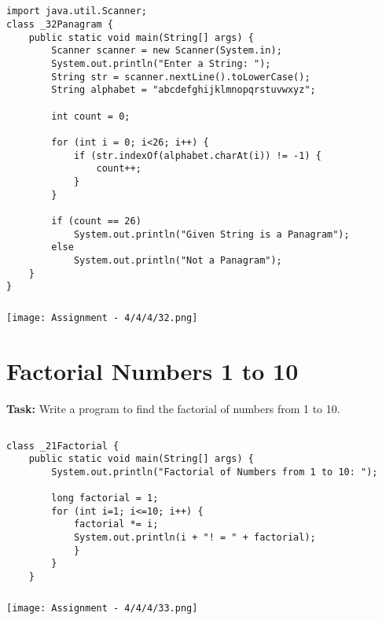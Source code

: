 \documentclass[12pt,a4paper]{article}
\begin{document}
\subsection{}
\begin{lstlisting}
import java.util.Scanner;
class _32Panagram {
    public static void main(String[] args) {
        Scanner scanner = new Scanner(System.in);
        System.out.println("Enter a String: ");
        String str = scanner.nextLine().toLowerCase();
        String alphabet = "abcdefghijklmnopqrstuvwxyz";
    
        int count = 0;
    
        for (int i = 0; i<26; i++) {
            if (str.indexOf(alphabet.charAt(i)) != -1) {
                count++;
            }
        }
    
        if (count == 26)
            System.out.println("Given String is a Panagram");
        else
            System.out.println("Not a Panagram");
    }
}
\end{lstlisting}

\subsubsection{}
\begin{center}
    \texttt{[image: Assignment - 4/4/4/32.png]}
\end{center}


\section{Factorial Numbers 1 to 10}
\textbf{Task:} Write a program to find the factorial of numbers from 1 to 10.

\subsection{}
\begin{lstlisting}
class _21Factorial {
    public static void main(String[] args) {
        System.out.println("Factorial of Numbers from 1 to 10: ");
    
        long factorial = 1;
        for (int i=1; i<=10; i++) {
            factorial *= i;
            System.out.println(i + "! = " + factorial);
            }
        }
	}
\end{lstlisting}

\subsubsection{}
\begin{center}
    \texttt{[image: Assignment - 4/4/4/33.png]}
\end{center}
\end{document}
